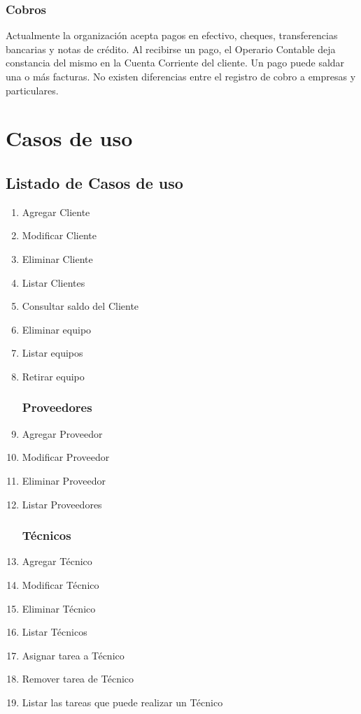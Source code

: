 \documentclass[12pt]{extarticle}
\begin{document}
\begin{spacing}{1.2}
	\subsubsection{Cobros}
     Actualmente la organización acepta pagos en efectivo, cheques, transferencias bancarias y notas de crédito. Al recibirse un pago, el Operario Contable deja constancia del mismo en la Cuenta Corriente del cliente. Un pago puede saldar una o más facturas. No existen diferencias entre el registro de cobro a empresas y particulares.\\



    \clearpage
    \section{Casos de uso}
    \subsection{Listado de Casos de uso}
    \begin{multicols}{2}
    \begin{enumerate}	
        \subsubsection*{Clientes}
            \item Agregar Cliente
            \item Modificar Cliente
            \item Eliminar Cliente
            \item Listar Clientes
            \item Consultar saldo del Cliente
            \item Eliminar equipo
            \item Listar equipos
            \item Retirar equipo
        \subsubsection*{Proveedores}
            \item Agregar Proveedor
            \item Modificar Proveedor
            \item Eliminar Proveedor
            \item Listar Proveedores	
        \subsubsection*{Técnicos}
            \item Agregar Técnico
            \item Modificar Técnico
            \item Eliminar Técnico
            \item Listar Técnicos	
            \item Asignar tarea a Técnico
            \item Remover tarea de Técnico
            \item Listar las tareas que puede realizar un Técnico

\end{enumerate}
\end{multicols}
\end{spacing}
\end{document}
